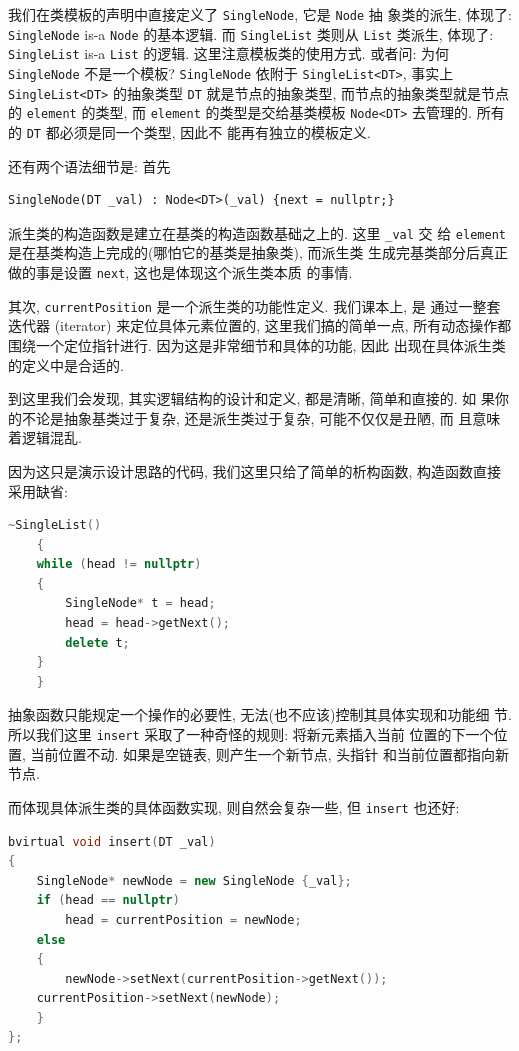\documentclass[a4paper]{ctexart}
\theoremstyle{definition}
\theoremstyle{definition}
\begin{document}
我们在类模板的声明中直接定义了 \verb|SingleNode|, 它是 \verb|Node| 抽
象类的派生, 体现了: \verb|SingleNode| is-a \verb|Node| 的基本逻辑. 而
\verb|SingleList| 类则从 \verb|List| 类派生, 体现了: \verb|SingleList|
is-a \verb|List| 的逻辑. 这里注意模板类的使用方式. 或者问: 为何
\verb|SingleNode| 不是一个模板? \verb|SingleNode| 依附于
\verb|SingleList<DT>|, 事实上 \verb|SingleList<DT>| 的抽象类型
\verb|DT| 就是节点的抽象类型, 而节点的抽象类型就是节点的
\verb|element| 的类型, 而 \verb|element| 的类型是交给基类模板
\verb|Node<DT>| 去管理的. 所有的 \verb|DT| 都必须是同一个类型, 因此不
能再有独立的模板定义. 

还有两个语法细节是: 首先
\begin{verbatim}
SingleNode(DT _val) : Node<DT>(_val) {next = nullptr;}
\end{verbatim}

派生类的构造函数是建立在基类的构造函数基础之上的. 这里 \verb|_val| 交
给 \verb|element| 是在基类构造上完成的(哪怕它的基类是抽象类), 而派生类
生成完基类部分后真正做的事是设置 \verb|next|, 这也是体现这个派生类本质
的事情.

其次, \verb|currentPosition| 是一个派生类的功能性定义. 我们课本上, 是
通过一整套迭代器 (iterator) 来定位具体元素位置的, 这里我们搞的简单一点,
所有动态操作都围绕一个定位指针进行. 因为这是非常细节和具体的功能, 因此
出现在具体派生类的定义中是合适的. 

到这里我们会发现, 其实逻辑结构的设计和定义, 都是清晰, 简单和直接的. 如
果你的不论是抽象基类过于复杂, 还是派生类过于复杂, 可能不仅仅是丑陋, 而
且意味着逻辑混乱.

因为这只是演示设计思路的代码, 我们这里只给了简单的析构函数, 构造函数直接采用缺省:
\begin{lstlisting}[language=C++]
    ~SingleList()
    {
	while (head != nullptr)
	{
	    SingleNode* t = head;
	    head = head->getNext();
	    delete t;
	}
    }
\end{lstlisting}

抽象函数只能规定一个操作的必要性, 无法(也不应该)控制其具体实现和功能细
节. 所以我们这里 \verb|insert| 采取了一种奇怪的规则: 将新元素插入当前
位置的下一个位置, 当前位置不动. 如果是空链表, 则产生一个新节点, 头指针
和当前位置都指向新节点. 

而体现具体派生类的具体函数实现, 则自然会复杂一些, 但 \verb|insert| 也还好:

\begin{lstlisting}[language=C++]
bvirtual void insert(DT _val)
{
    SingleNode* newNode = new SingleNode {_val};
    if (head == nullptr)
        head = currentPosition = newNode;
    else
    {
        newNode->setNext(currentPosition->getNext());
	currentPosition->setNext(newNode);
    }
};
\end{lstlisting}
\end{document}
